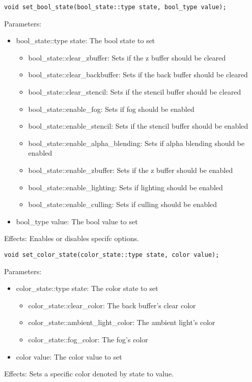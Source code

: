 \documentclass{article}
\begin{document}
\begin{lstlisting}
void set_bool_state(bool_state::type state, bool_type value);
\end{lstlisting}
Parameters:
\begin{itemize}
\item bool\_state::type state: The bool state to set
  \begin{itemize}
  \item bool\_state::clear\_zbuffer: Sets if the z buffer should be cleared
  \item bool\_state::clear\_backbuffer: Sets if the back buffer should be cleared
  \item bool\_state::clear\_stencil: Sets if the stencil buffer should be cleared
  \item bool\_state::enable\_fog: Sets if fog should be enabled
  \item bool\_state::enable\_stencil: Sets if the stencil buffer should be enabled
  \item bool\_state::enable\_alpha\_blending: Sets if alpha blending should be enabled
  \item bool\_state::enable\_zbuffer: Sets if the z buffer should be enabled
  \item bool\_state::enable\_lighting: Sets if lighting should be enabled
  \item bool\_state::enable\_culling: Sets if culling should be enabled
  \end{itemize}
\item bool\_type value: The bool value to set
\end{itemize}
Effects: Enables or disables specifc options.

\begin{lstlisting}
void set_color_state(color_state::type state, color value);
\end{lstlisting}
Parameters:
\begin{itemize}
\item color\_state::type state: The color state to set
  \begin{itemize}
  \item color\_state::clear\_color: The back buffer's clear color
  \item color\_state::ambient\_light\_color: The ambient light's color
  \item color\_state::fog\_color: The fog's color
  \end{itemize}
\item color value: The color value to set
\end{itemize}
Effects: Sets a specific color denoted by state to value.
	
\end{document}
